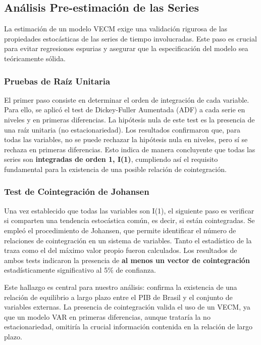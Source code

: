 \documentclass[12pt, a4paper]{article}
\begin{document}
\subsection{Análisis Pre-estimación de las Series}
La estimación de un modelo VECM exige una validación rigurosa de las propiedades estocásticas de las series de tiempo involucradas. Este paso es crucial para evitar regresiones espurias y asegurar que la especificación del modelo sea teóricamente sólida.

\subsubsection{Pruebas de Raíz Unitaria}
El primer paso consiste en determinar el orden de integración de cada variable. Para ello, se aplicó el test de Dickey-Fuller Aumentada (ADF) a cada serie en niveles y en primeras diferencias. La hipótesis nula de este test es la presencia de una raíz unitaria (no estacionariedad). Los resultados confirmaron que, para todas las variables, no se puede rechazar la hipótesis nula en niveles, pero sí se rechaza en primeras diferencias. Esto indica de manera concluyente que todas las series son \textbf{integradas de orden 1, I(1)}, cumpliendo así el requisito fundamental para la existencia de una posible relación de cointegración.

\subsubsection{Test de Cointegración de Johansen}
Una vez establecido que todas las variables son I(1), el siguiente paso es verificar si comparten una tendencia estocástica común, es decir, si están cointegradas. Se empleó el procedimiento de Johansen, que permite identificar el número de relaciones de cointegración en un sistema de variables. Tanto el estadístico de la traza como el del máximo valor propio fueron calculados. Los resultados de ambos tests indicaron la presencia de \textbf{al menos un vector de cointegración} estadísticamente significativo al 5\% de confianza.

Este hallazgo es central para nuestro análisis: confirma la existencia de una relación de equilibrio a largo plazo entre el PIB de Brasil y el conjunto de variables externas. La presencia de cointegración valida el uso de un VECM, ya que un modelo VAR en primeras diferencias, aunque trataría la no estacionariedad, omitiría la crucial información contenida en la relación de largo plazo.
\end{document}
